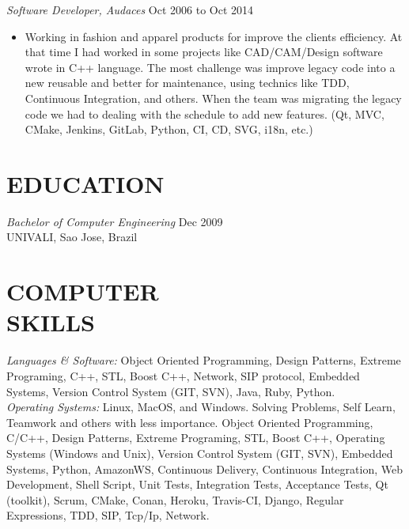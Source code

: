 \documentclass[line,margin]{res}
\begin{document}
\begin{resume}
                {\sl Software Developer, Audaces} \hfill Oct 2006 to Oct 2014 \\
                  \begin{itemize}
                   \item Working in fashion and apparel products for improve the clients efficiency. At that time I had worked in some projects like CAD/CAM/Design software wrote in C++ language. The most challenge was improve legacy code into a new reusable and better for maintenance, using technics like TDD, Continuous Integration, and others. When the team was migrating the legacy code we had to dealing with the schedule to add new features. (Qt, MVC, CMake, Jenkins, GitLab, Python, CI, CD, SVG, i18n, etc.)
                   \end{itemize}
\section{EDUCATION} {\sl Bachelor of Computer Engineering} \hfill Dec 2009\\
                UNIVALI, Sao Jose, Brazil


\section{COMPUTER \\ SKILLS} {\sl Languages \& Software:} Object Oriented Programming, Design Patterns, Extreme Programing, C++, STL, Boost C++, Network, SIP protocol, Embedded Systems, Version Control System (GIT, SVN), Java, Ruby, Python. \\
                {\sl Operating Systems:} Linux, MacOS, and Windows.
                Solving Problems, Self Learn, Teamwork and others with less importance.
                Object Oriented Programming, C/C++, Design Patterns, Extreme Programing, STL, Boost C++, Operating Systems (Windows and Unix), Version Control System (GIT, SVN), Embedded Systems, Python, AmazonWS, Continuous Delivery, Continuous Integration, Web Development, Shell Script, Unit Tests, Integration Tests, Acceptance Tests, Qt (toolkit), Scrum, CMake, Conan, Heroku, Travis-CI, Django, Regular Expressions, TDD, SIP, Tcp/Ip, Network.

\end{resume}
\end{document}
